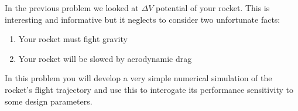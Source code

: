 \documentclass[]{memoir} %
\begin{document}
In the previous problem we looked at $\Delta V$ potential of your rocket.  This is interesting and 
informative but it neglects to consider two unfortunate facts:

\begin{enumerate}
    \item Your rocket must fight gravity
    \item Your rocket will be slowed by aerodynamic drag
\end{enumerate}

In this problem you will develop a very simple numerical simulation of the rocket's flight trajectory
and use this to interogate its performance sensitivity to some design parameters.



\end{document}
